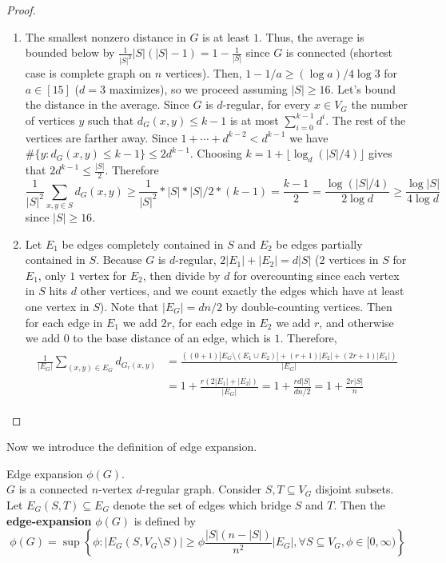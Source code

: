 \begin{proof}

\begin{enumerate}
\item The smallest nonzero distance in $G$ is at least $1$. Thus, the average is bounded below by $\frac{1}{|S|^2}|S|(|S| - 1) = 1 - \frac{1}{|S|}$ since $G$ is connected (shortest case is complete graph on $n$ vertices). Then, $1 - 1/a \geq (\log a)/4 \log 3$ for $a \in [15]$ ($d = 3$ maximizes), so we proceed assuming $|S| \geq 16$. Let's bound the distance in the average. Since $G$ is $d$-regular, for every $x \in V_G$ the number of vertices $y$ such that $d_G(x, y) \leq k -1$ is at most $\sum_{i = 0}^{k - 1} d^i$. The rest of the vertices are farther away. Since $1 + \cdots + d^{k - 2} < d^{k -1}$ we have $\#\{y: d_G(x, y) \leq k - 1\} \leq 2d^{k - 1}$. Choosing $k = 1 + \lfloor \log_d(|S|/4) \rfloor$ gives that $2d^{k - 1} \leq \frac{|S|}{2}$. Therefore
\[
\frac{1}{|S|^2}\sum_{x, y \in S}d_G(x, y) \geq \frac{1}{|S|^2} * |S| * |S|/2 * (k - 1) = \frac{k -1}{2} = \frac{\log(|S|/4)}{2 \log d} \geq \frac{\log |S|}{4\log d}
\]
since $|S| \geq 16$.

\item Let $E_1$ be edges completely contained in $S$ and $E_2$ be edges partially contained in $S$. Because $G$ is $d$-regular, $2|E_1| + |E_2| = d|S|$ ($2$ vertices in $S$ for $E_1$, only $1$ vertex for $E_2$, then divide by $d$ for overcounting since each vertex in $S$ hits $d$ other vertices, and we count exactly the edges which have at least one vertex in $S$). Note that $|E_G| = dn/2$ by double-counting vertices. Then for each edge in $E_1$ we add $2r$, for each edge in $E_2$ we add $r$, and otherwise we add $0$ to the base distance of an edge, which is $1$. Therefore, 
\begin{align*}
\begin{split}
\frac{1}{|E_G|}\sum_{(x, y ) \in E_G} d_{G_r(x, y)} &= \frac{\left((0 + 1)|E_G \setminus (E_1 \cup E_2)| + (r + 1)|E_2| + (2r + 1)|E_1|\right)}{|E_G|} 
\\
&= 1 + \frac{r(2|E_1| + |E_2|)}{|E_G|} = 1 + \frac{rd|S|}{dn/2} = 1 + \frac{2r|S|}{n}
\end{split}
\end{align*}

\end{enumerate}
\end{proof}

Now we introduce the definition of edge expansion. 

\begin{df} Edge expansion $\phi(G)$. \\
$G$ is a connected $n$-vertex $d$-regular graph.
Consider $S, T \subseteq V_G$ disjoint subsets. Let $E_G(S, T) \subseteq E_G$ denote the set of edges which bridge $S$ and $T$.
Then the \textbf{edge-expansion} $\phi(G)$ is defined by
\[
\phi(G) = \sup \left\{\phi: |E_G(S, V_G\setminus S)| \geq \phi\frac{|S|(n - |S|)}{n^2}|E_G|, \forall S \subseteq V_G, \phi \in [0, \infty)\right\}
\]
\end{df}

